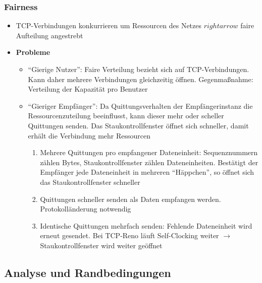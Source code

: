 \subsubsection{Fairness}
\begin{itemize}
	\item TCP-Verbindungen konkurrieren um Ressourcen des Netzes \(rightarrow\) faire Aufteilung angestrebt
	\item \textbf{Probleme}
	\begin{itemize}
		\item "`Gierige Nutzer"': Faire Verteilung bezieht sich auf TCP-Verbindungen. Kann daher mehrere Verbindungen gleichzeitig öffnen. Gegenmaßnahme: Verteilung der Kapazität pro Benutzer
		\item "`Gieriger Empfänger"': Da Quittungsverhalten der Empfängerinstanz die Ressourcenzuteilung beeinflusst, kann dieser mehr oder scheller Quittungen senden. Das Staukontrollfenster öffnet sich schneller, damit erhält die Verbindung mehr Ressourcen
		\begin{enumerate}
			\item Mehrere Quittungen pro empfangener Dateneinheit: Sequenznummern zählen Bytes, Staukontrollfenster zählen Dateneinheiten. Bestätigt der Empfänger jede Dateneinheit in mehreren "`Häppchen"', so öffnet sich das Staukontrollfenster schneller
			\item Quittungen schneller senden als Daten empfangen werden. Protokolländerung notwendig
			\item Identische Quittungen mehrfach senden: Fehlende Dateneinheit wird erneut gesendet. Bei TCP-Reno läuft Self-Clocking weiter \(\rightarrow\) Staukontrollfenster wird weiter geöffnet
		\end{enumerate}
	\end{itemize}
\end{itemize}

\subsection{Analyse und Randbedingungen}

